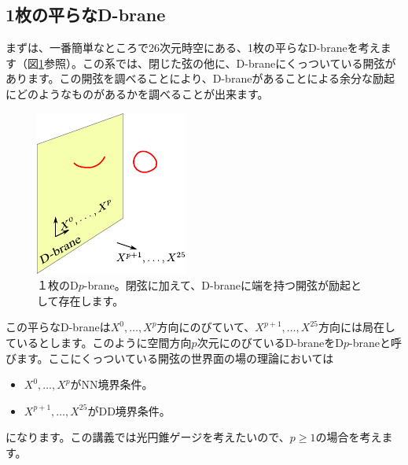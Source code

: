 \documentclass[report,paper=a4, fontsize=12pt, line_length=16cm, number_of_lines=34,dvipdfmx]{jlreq}
\numberwithin{equation}{chapter}
\numberwithin{equation}{section}
\begin{document}
\subsection{1枚の平らなD-brane}
まずは、一番簡単なところで26次元時空にある、1枚の平らなD-braneを考えます（図\ref{fig:singlebrane}参照）。この系では、閉じた弦の他に、D-braneにくっついている開弦があります。この開弦を調べることにより、D-braneがあることによる余分な励起にどのようなものがあるかを調べることが出来ます。
\begin{figure}
  \centering
  \includegraphics[scale=1.5]{singlebrane.pdf}
  \caption{１枚のD$p$-brane。閉弦に加えて、D-braneに端を持つ開弦が励起として存在します。}
  \label{fig:singlebrane}
\end{figure}


この平らなD-braneは$X^0,\dots,X^{p}$方向にのびていて、$X^{p+1},\dots,X^{25}$方向には局在しているとします。このように空間方向$p$次元にのびているD-braneをD$p$-braneと呼びます。ここにくっついている開弦の世界面の場の理論においては
\begin{itemize}
  \item $X^0,\dots,X^{p}$がNN境界条件。
  \item $X^{p+1},\dots,X^{25}$がDD境界条件。
\end{itemize}
になります。この講義では光円錐ゲージを考えたいので、$p\ge 1$の場合を考えます。
\end{document}
